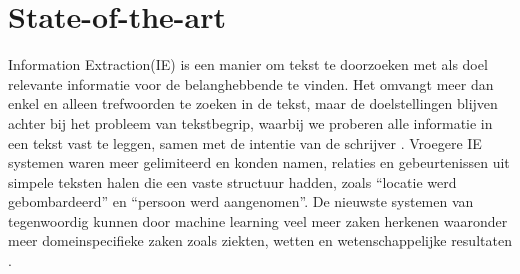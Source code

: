 
\section{State-of-the-art}%
\label{sec:state-of-the-art}

%
%
%
%
%
%

Information Extraction(IE) is een manier om tekst te doorzoeken met als doel relevante informatie voor de belanghebbende te vinden. Het omvangt meer dan enkel en alleen trefwoorden te zoeken in de tekst, maar de doelstellingen blijven achter bij het probleem van tekstbegrip, waarbij we proberen alle informatie in een tekst vast te leggen, samen met de intentie van de schrijver \autocite{hobbs2010}. Vroegere IE systemen waren meer gelimiteerd en konden namen, relaties en gebeurtenissen uit simpele teksten halen die een vaste structuur hadden, zoals ``locatie werd gebombardeerd'' en ``persoon werd aangenomen''. De nieuwste systemen van tegenwoordig kunnen door machine learning veel meer zaken herkenen waaronder meer domeinspecifieke zaken zoals ziekten, wetten en wetenschappelijke resultaten \autocite{Small2014}.

